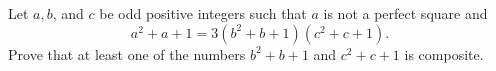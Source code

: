Let $a,b$,  and $c$ be odd positive integers such that $a$ is not a perfect square and$$a^2+a+1 = 3(b^2+b+1)(c^2+c+1).$$Prove that at least one of the numbers $b^2+b+1$ and $c^2+c+1$ is composite.
